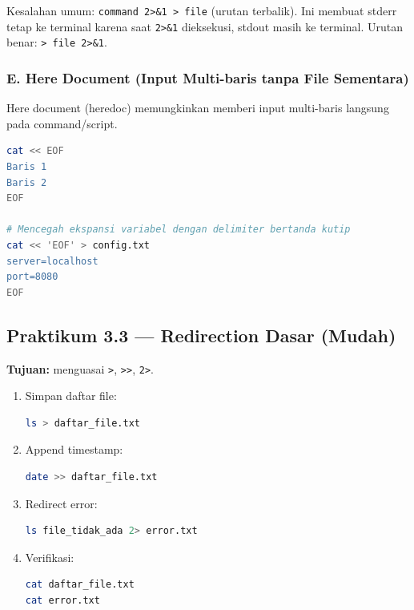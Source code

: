\begin{warningbox}
Kesalahan umum: \texttt{command 2>\&1 > file} (urutan terbalik).
Ini membuat stderr tetap ke terminal karena saat \texttt{2>\&1} dieksekusi, stdout masih ke terminal.
Urutan benar: \texttt{> file 2>\&1}.
\end{warningbox}

\subsubsection*{E. Here Document (Input Multi-baris tanpa File Sementara)}
Here document (heredoc) memungkinkan memberi input multi-baris langsung pada command/script.

\begin{lstlisting}[language=bash, caption={Here document untuk input multi-baris}]
cat << EOF
Baris 1
Baris 2
EOF

# Mencegah ekspansi variabel dengan delimiter bertanda kutip
cat << 'EOF' > config.txt
server=localhost
port=8080
EOF
\end{lstlisting}

\subsection*{Praktikum 3.3 --- Redirection Dasar (Mudah)}
\textbf{Tujuan:} menguasai \texttt{>}, \texttt{>>}, \texttt{2>}.

\begin{enumerate}
    \item Simpan daftar file:
\begin{lstlisting}[language=bash, caption={Redirect stdout}]
ls > daftar_file.txt
\end{lstlisting}

    \item Append timestamp:
\begin{lstlisting}[language=bash, caption={Append output}]
date >> daftar_file.txt
\end{lstlisting}

    \item Redirect error:
\begin{lstlisting}[language=bash, caption={Redirect stderr}]
ls file_tidak_ada 2> error.txt
\end{lstlisting}

    \item Verifikasi:
\begin{lstlisting}[language=bash, caption={Cek hasil redirection}]
cat daftar_file.txt
cat error.txt
\end{lstlisting}
\end{enumerate}

